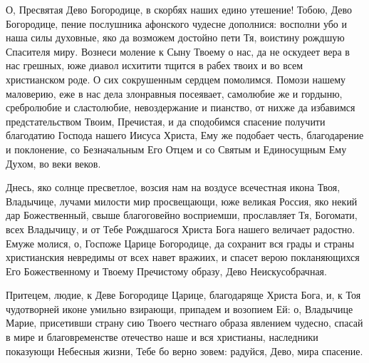  

О, Пресвятая Дево Богородице, в скорбях наших едино утешение! Тобою, Дево Богородице, пение послушника афонского чудесне дополнися: восполни убо и наша силы духовные, яко да возможем достойно пети Тя, воистину рождшую Спасителя миру. Вознеси моление к Сыну Твоему о нас, да не оскудеет вера в нас грешных, юже диавол исхитити тщится в рабех твоих и во всем христианском роде. О сих сокрушенным сердцем помолимся. Помози нашему маловерию, еже в нас дела злонравныя посеявает, самолюбие же и гордыню, сребролюбие и сластолюбие, невоздержание и пианство, от нихже да избавимся предстательством Твоим, Пречистая, и да сподобимся спасение получити благодатию Господа нашего Иисуса Христа, Ему же подобает честь, благодарение и поклонение, со Безначальным Его Отцем и со Святым и Единосущным Ему Духом, во веки веков.
\mychapterending

 




Днесь, яко солнце пресветлое, возсия нам на воздусе всечестная икона Твоя, Владычице, лучами милости мир просвещающи, юже великая Россия, яко некий дар Божественный, свыше благоговейно восприемши, прославляет Тя, Богомати, всех Владычицу, и от Тебе Рождшагося Христа Бога нашего величает радостно. Емуже молися, о, Госпоже Царице Богородице, да сохранит вся грады и страны христианския невредимы от всех навет вражиих, и спасет верою покланяющихся Его Божественному и Твоему Пречистому образу, Дево Неискусобрачная.




Притецем, людие, к Деве Богородице Царице, благодаряще Христа Бога, и, к Тоя чудотворней иконе умильно взирающи, припадем и возопием Ей: о, Владычице Марие, присетивши страну сию Твоего честнаго образа явлением чудесно, спасай в мире и благовременстве отечество наше и вся христианы, наследники показующи Небесныя жизни, Тебе бо верно зовем: радуйся, Дево, мира спасение.





